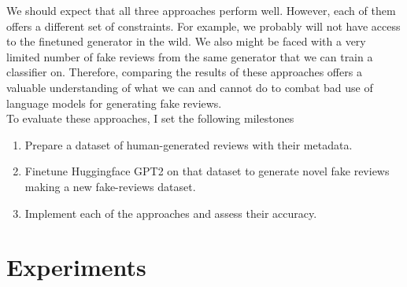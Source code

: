 \documentclass{article}
\begin{document}
We should expect that all three approaches perform well. However, each of them offers a different set of constraints. For example, we probably will not have access to the finetuned generator in the wild. We also might be faced with a very limited number of fake reviews from the same generator that we can train a classifier on. Therefore, comparing the results of these approaches offers a valuable understanding of what we can and cannot do to combat bad use of language models for generating fake reviews.
\\ To evaluate these approaches, I set the following milestones
\begin{enumerate}
\item Prepare a dataset of human-generated reviews with their metadata.
\item Finetune Huggingface GPT2 on that dataset to generate novel fake reviews making a new fake-reviews dataset.
\item Implement each of the approaches and assess their accuracy.
\end{enumerate}

\section{Experiments}
\end{document}
